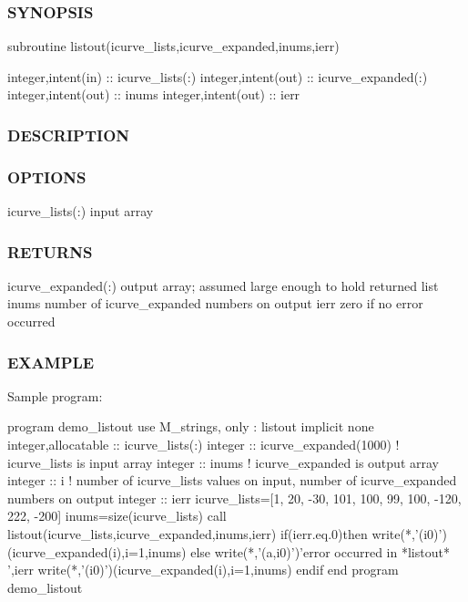 \subsubsection*{S\+Y\+N\+O\+P\+S\+IS}

subroutine listout(icurve\+\_\+lists,icurve\+\_\+expanded,inums,ierr)

integer,intent(in) \+:\+: icurve\+\_\+lists(\+:) integer,intent(out) \+:\+: icurve\+\_\+expanded(\+:) integer,intent(out) \+:\+: inums integer,intent(out) \+:\+: ierr \subsubsection*{D\+E\+S\+C\+R\+I\+P\+T\+I\+ON}

\subsubsection*{O\+P\+T\+I\+O\+NS}

icurve\+\_\+lists(\+:) input array

\subsubsection*{R\+E\+T\+U\+R\+NS}

icurve\+\_\+expanded(\+:) output array; assumed large enough to hold returned list inums number of icurve\+\_\+expanded numbers on output ierr zero if no error occurred

\subsubsection*{E\+X\+A\+M\+P\+LE}

Sample program\+: \begin{DoxyVerb} program demo_listout
 use M_strings, only : listout
 implicit none
 integer,allocatable :: icurve_lists(:)
 integer :: icurve_expanded(1000)
 ! icurve_lists is input array
 integer :: inums
 ! icurve_expanded is output array
 integer :: i
 ! number of icurve_lists values on input, number of icurve_expanded numbers on output
 integer :: ierr
    icurve_lists=[1, 20, -30, 101, 100, 99, 100, -120, 222, -200]
    inums=size(icurve_lists)
    call listout(icurve_lists,icurve_expanded,inums,ierr)
    if(ierr.eq.0)then
       write(*,'(i0)')(icurve_expanded(i),i=1,inums)
    else
       write(*,'(a,i0)')'error occurred in *listout* ',ierr
       write(*,'(i0)')(icurve_expanded(i),i=1,inums)
    endif
 end program demo_listout
\end{DoxyVerb}


